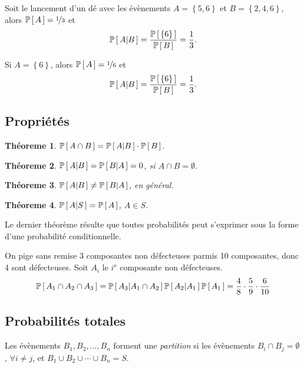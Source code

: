 \documentclass[11pt]{article}
\renewcommand\P[1]{%
	\ensuremath{%
		\mathbb{P}\left[\,#1\,\right]%
	}%
}%
\newcommand\Pg[2]{%
	\ensuremath{%
		\mathbb{P}\left[\,#1\middle\rvert#2\,\right]%
	}%
}%
\newtheorem{theoreme}{Théoreme}[section]
\begin{document}
\begin{exemple}
	Soit le lancement d'un dé avec les évènements $A=\left\{5,6\right\}$ et
	$B=\left\{2,4,6\right\}$, alors $\P{A}=\nicefrac{1}{3}$ et 
	\begin{equation*}
		\Pg{A}{B}=\frac{\P{\left\{6\right\}}}{\P{B}}=\frac{1}{3}.
	\end{equation*}

	Si $A=\left\{6\right\}$, alors $\P{A}=\nicefrac{1}{6}$ et
	\begin{equation*}
		\Pg{A}{B}=\frac{\P{\left\{6\right\}}}{\P{B}}=\frac{1}{3}.
	\end{equation*}
\end{exemple}

\subsection{Propriétés}
\begin{theoreme}
	$\P{A\cap B}=\Pg{A}{B}\cdot\P{B}$.
\end{theoreme}

\begin{theoreme}
	$\Pg{A}{B}=\Pg{B}{A}=0$, si $A\cap B=\emptyset$.
\end{theoreme}

\begin{theoreme}
	$\Pg{A}{B}\neq\Pg{B}{A}$, en général.
\end{theoreme}

\begin{theoreme}
	$\Pg{A}{S}=\P{A}$, $A\in S$.
\end{theoreme}

Le dernier théorème résulte que toutes probabilités peut s'exprimer sous la
forme d'une probabilité conditionnelle.

\begin{exemple}
	On pige sans remise 3 composantes non défecteuses parmis 10 composantes, donc 4 sont
	défecteuses. Soit $A_i$ le $i^\text{e}$ composante non défecteuses.
	\begin{equation*}
		\P{A_1\cap A_2\cap A_3}=\Pg{A_3}{A_1\cap A_2}\Pg{A_2}{A_1}\P{A_1}
		=\frac{4}{8}\cdot\frac{5}{9}\cdot\frac{6}{10}
	\end{equation*}
\end{exemple}

\subsection{Probabilités totales}
\begin{definition}
	Les évènements $B_1,B_2,\dots,B_n$ forment une \textit{partition} si les
	évènements $B_i\cap B_j=\emptyset$, $\forall i\neq j$, et
	$B_1\cup B_2\cup\cdots\cup B_n=S$.
\end{definition}
\end{document}
